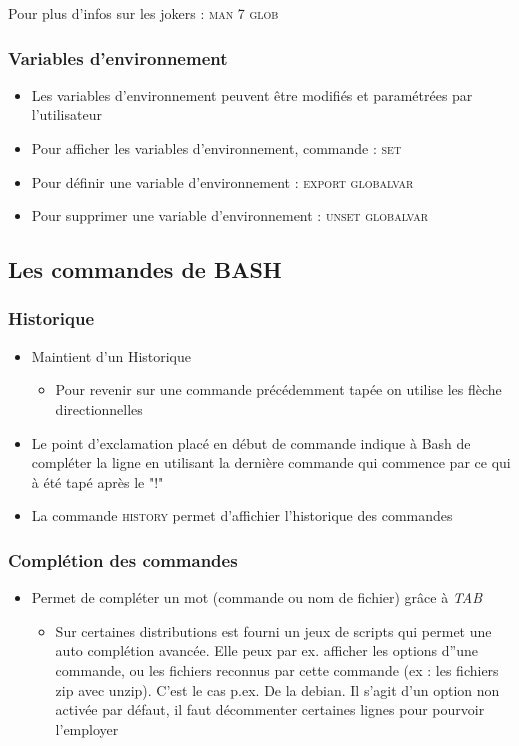 \documentclass[a4paper]{article}
\begin{document}
    Pour plus d'infos sur les jokers : \textsc{man 7 glob}

    \subsubsection{Variables d'environnement}
    \begin{itemize}[label=\textbullet, font=\Large]
      \item Les variables d'environnement peuvent être modifiés et paramétrées par l'utilisateur
      \item Pour afficher les variables d'environnement, commande : \textsc{set}
      \item Pour définir une variable d’environnement : \textsc{export globalvar}
      \item Pour supprimer une variable d’environnement : \textsc{unset globalvar}
    \end{itemize}
    \subsection{Les commandes de BASH}
    \subsubsection{Historique}
    \begin{itemize}[label=\textbullet, font=\Large]
      \item Maintient d'un Historique
      \begin{itemize}[label=, font=\scriptsize]
        \item Pour revenir sur une commande précédemment tapée on utilise les flèche directionnelles
      \end{itemize}
      \item Le point d’exclamation placé en début de commande indique à Bash de
      compléter la ligne en utilisant la dernière commande qui commence par ce qui à été tapé après le "!"
      \item La commande \textsc{history} permet d'affichier l'historique des commandes
    \end{itemize}
    \subsubsection{Complétion des commandes}
    \begin{itemize}[label=\textbullet, font=\Large]
      \item Permet de compléter un mot (commande ou nom de fichier) grâce à \emph{TAB}
      \begin{itemize}[label=, font=\scriptsize]
        \item Sur certaines distributions est fourni un jeux de scripts qui permet une auto complétion avancée. Elle peux par ex. afficher les
        options d''une commande, ou les fichiers reconnus par cette commande (ex : les fichiers zip avec unzip). C’est le cas p.ex. De
        la debian. Il s’agit d’un option non activée par défaut, il faut décommenter certaines lignes pour pourvoir l’employer
      \end{itemize}
    \end{itemize}
\end{document}
